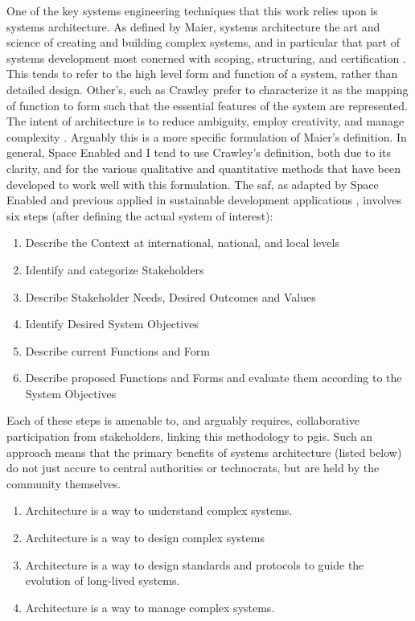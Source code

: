 \documentclass[notitlepage]{article}
\begin{document}
One of the key systems engineering techniques that this work relies upon is systems architecture. As defined by Maier, systems architecture the art and science of creating and building complex systems, and in particular that part of systems development most conerned with scoping, structuring, and certification \cite{maierArtSystemsArchitecting2009}. This tends to refer to the high level form and function of a system, rather than detailed design. Other's, such as Crawley prefer to characterize it as the mapping of function to form such that the essential features of the system are represented. The intent of architecture is to reduce ambiguity, employ creativity, and manage complexity \cite{crawleySystemArchitectureStrategy2015}. Arguably this is a more specific formulation of Maier's definition. In general, Space Enabled and I tend to use Crawley's definition, both due to its clarity, and for the various qualitative and quantitative methods that have been developed to work well with this formulation. The \ac{saf}, as adapted by Space Enabled and previous applied in sustainable development applications \cite{ovienmhadaInclusiveDesignEarth2021}, involves six steps (after defining the actual system of interest):

\begin{enumerate}[itemsep=0pt,parsep=0pt]
	\item{Describe the Context at international, national, and local levels}
	\item{Identify and categorize Stakeholders}
	\item{Describe Stakeholder Needs, Desired Outcomes and Values}
	\item{Identify Desired System Objectives}
	\item{Describe current Functions and Form}
	\item{Describe proposed Functions and Forms and evaluate them according to the System Objectives}
\end{enumerate}

Each of these steps is amenable to, and arguably requires, collaborative participation from stakeholders, linking this methodology to \ac{pgis}. Such an approach means that the primary benefits of systems architecture (listed below) \cite{crawley2004} do not just accure to central authorities or technocrats, but are held by the community themselves.

\begin{enumerate}[itemsep=0pt,parsep=0pt]
	\item{Architecture is a way to understand complex systems.}
	\item{Architecture is a way to design complex systems}
	\item{Architecture is a way to design standards and protocols to guide the evolution of long-lived systems.}
	\item{Architecture is a way to manage complex systems.}
\end{enumerate}
\end{document}
